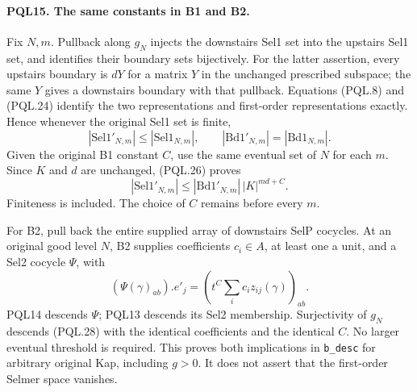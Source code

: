 \paragraph{PQL15. The same constants in B1 and B2.}\label{claim:PQL15}
Fix \(N,m\). Pullback along \(g_N\) injects the downstairs
Sel1 set into the upstairs Sel1 set, and identifies their
boundary sets bijectively. For the latter assertion,
every upstairs boundary is \(dY\) for a matrix \(Y\)
in the unchanged prescribed subspace; the same \(Y\)
gives a downstairs boundary with that pullback.
Equations (PQL.8) and (PQL.24) identify the two
representations and first-order representations exactly.
Hence whenever the original Sel1 set is finite,
\[
 |\mathrm{Sel1}'_{N,m}|\leq|\mathrm{Sel1}_{N,m}|,\qquad
 |\mathrm{Bd1}'_{N,m}|=|\mathrm{Bd1}_{N,m}|.
                                                            \tag{PQL.26}
\]
Given the original B1 constant \(C\), use the same eventual
set of \(N\) for each \(m\). Since \(K\) and \(d\) are
unchanged, (PQL.26) proves
\[
 |\mathrm{Sel1}'_{N,m}|
 \leq|\mathrm{Bd1}'_{N,m}|\,|K|^{md+C}.
                                                            \tag{PQL.27}
\]
Finiteness is included. The choice of \(C\) remains
before every \(m\).

For B2, pull back the entire supplied array of downstairs
SelP cocycles. At an original good level \(N\), B2 supplies
coefficients \(c_i\in A\), at least one a unit, and a
Sel2 cocycle \(\Psi\), with
\[
 (\Psi(\gamma)_{ab}).e'_j
       =\left(t^C\sum_i c_i z_{ij}(\gamma)\right)_{ab}.
                                                            \tag{PQL.28}
\]
PQL14 descends \(\Psi\); PQL13 descends its Sel2
membership. Surjectivity of \(g_N\) descends (PQL.28)
with the identical coefficients and the identical \(C\).
No larger eventual threshold is required.
This proves both implications in \texttt{b\_desc}
for arbitrary original Kap, including \(g>0\).
It does not assert that the first-order Selmer space vanishes.

